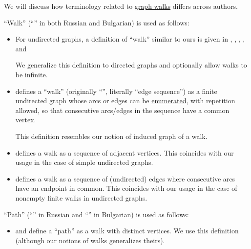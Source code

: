 \begin{remark}\label{rem:graph_walk_terminology}
  We will discuss how terminology related to \hyperref[def:graph_walk]{graph walks} differs across authors.

  \begin{thmenum}
     \enquote{Walk} (\enquote{} in both Russian and Bulgarian) is used as follows:
    \begin{itemize}
      \item For undirected graphs, a definition of \enquote{walk} similar to ours is given in
      \cite[21]{Diestel2017GraphTheory},
      \cite[13]{Harary1969GraphTheory},
      \cite[4]{Bollobás1998ModernGraphTheory}
      \cite[571]{Stanley2012EnumerativeCombinatoricsVol1},
      \cite[22]{ЕмеличевИПр1990ТеорияГрафов},
      \cite[128]{Зыков2004ТеорияГрафов} and
      \cite[\S 7.2.3]{Новиков2013ДискретнаяМатематика}

      We generalize this definition to directed graphs and optionally allow walks to be infinite.

      \item \Textcite[60]{König1990GraphTheory} defines a \enquote{walk} (originally \enquote{}, literally \enquote{edge sequence}) as a finite undirected graph whose arcs or edges can be \hyperref[def:set_enumeration]{enumerated}, with repetition allowed, so that consecutive arcs/edges in the sequence have a common vertex.

      This definition resembles our notion of induced graph of a walk.

      \item \Textcite[191]{Erickson2019Algorithms} defines a walk as a sequence of adjacent vertices. This coincides with our usage in the case of simple undirected graphs.

      \item \Textcite[12]{Мирчев2001Графи} defines a walk as a sequence of (undirected) edges where consecutive arcs have an endpoint in common. This coincides with our usage in the case of nonempty finite walks in undirected graphs.
    \end{itemize}

     \enquote{Path} (\enquote{} in Russian and \enquote{} in Bulgarian) is used as follows:
    \begin{itemize}
      \item \Textcite[13]{Harary1969GraphTheory} and \textcite[571]{Stanley2012EnumerativeCombinatoricsVol1} define a \enquote{path} as a walk with distinct vertices. We use this definition (although our notions of walks generalizes theirs).


\end{itemize}
\end{thmenum}
\end{remark}
